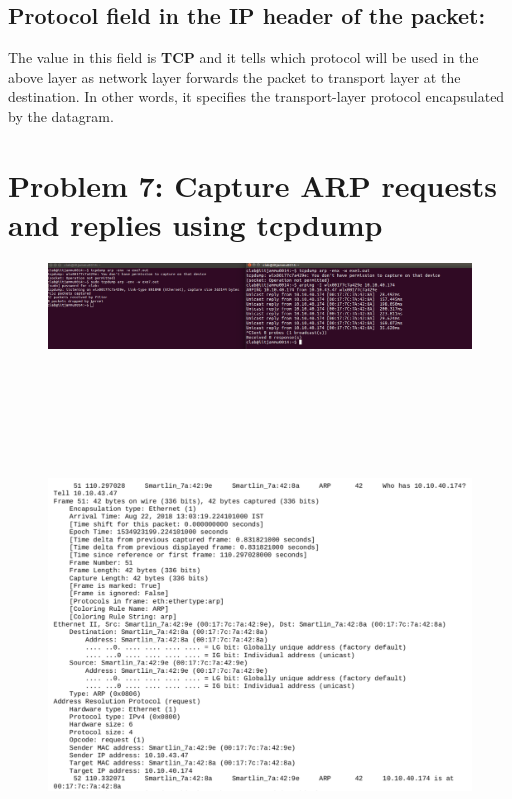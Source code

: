 \documentclass[]{report}
\begin{document}
\subsection{Protocol field in the IP header of the packet: }
The value in this field is \textbf{TCP} and it tells which protocol will be used in the above layer as network layer forwards the packet to transport layer at the destination. In other words, it specifies the transport-layer protocol encapsulated by the datagram.

\section{Problem 7: Capture ARP requests and replies using tcpdump}
\begin{figure}[H]
	\vspace{0pt}
	\includegraphics[width=600pt, keepaspectratio, center]{Snapshots/exe7/arping.png}
\end{figure}

\begin{figure}[H]
	\vspace{0pt}
	\includegraphics[height=400pt, keepaspectratio, center]{Snapshots/exe7/req.png}
\end{figure}
\end{document}
